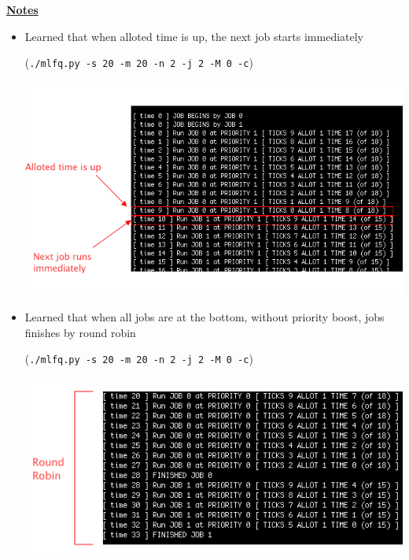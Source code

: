 \documentclass[12pt]{article}
\begin{document}
\begin{enumerate}[1.]
    \bigskip

    \underline{\textbf{Notes}}

    \begin{itemize}
        \item Learned that when alloted time is up, the next job starts immediately

        (\texttt{./mlfq.py -s 20 -m 20 -n 2 -j 2 -M 0 -c})

        \begin{center}
        \includegraphics[width=0.9\linewidth]{images/worksheet_5_solution_4.png}
        \end{center}

        \item Learned that when all jobs are at the bottom, without priority boost, jobs finishes by round robin

        (\texttt{./mlfq.py -s 20 -m 20 -n 2 -j 2 -M 0 -c})

        \begin{center}
        \includegraphics[width=0.8\linewidth]{images/worksheet_5_solution_5.png}
        \end{center}


\end{itemize}
\end{enumerate}
\end{document}
